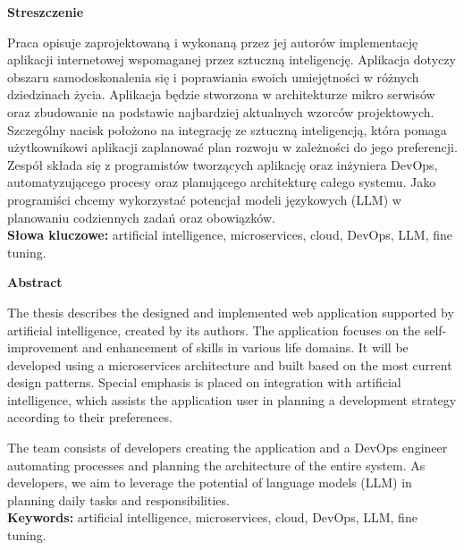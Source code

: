 \begin{center}
    {\bf\Large{Streszczenie}}\\
\end{center}
Praca opisuje zaprojektowaną i wykonaną przez jej autorów implementację
aplikacji internetowej wspomaganej przez sztuczną inteligencję. Aplikacja dotyczy obszaru samodoskonalenia się i poprawiania swoich umiejętności w różnych dziedzinach życia. Aplikacja będzie stworzona w architekturze mikro serwisów oraz zbudowanie na podstawie najbardziej aktualnych wzorców projektowych.
Szczególny nacisk położono na integrację ze sztuczną inteligencją, która pomaga użytkownikowi aplikacji zaplanować plan rozwoju w zależności do jego preferencji.
Zespół składa się z programistów tworzących aplikację oraz inżyniera DevOps, automatyzującego procesy oraz planującego architekturę całego systemu. Jako programiści chcemy wykorzystać potencjał modeli językowych (LLM) w planowaniu codziennych zadań oraz obowiązków.
\\
{\bf Słowa kluczowe:} artificial intelligence, microservices, cloud, DevOps, LLM, fine tuning.

\begin{center}
    {\bf\Large{Abstract}}\\
\end{center}
The thesis describes the designed and implemented web application supported by artificial intelligence, created by its authors. The application focuses on the self-improvement and enhancement of skills in various life domains. It will be developed using a microservices architecture and built based on the most current design patterns. Special emphasis is placed on integration with artificial intelligence, which assists the application user in planning a development strategy according to their preferences.

The team consists of developers creating the application and a DevOps engineer automating processes and planning the architecture of the entire system. As developers, we aim to leverage the potential of language models (LLM) in planning daily tasks and responsibilities.
\\
{\bf Keywords:} artificial intelligence, microservices, cloud, DevOps, LLM, fine tuning.